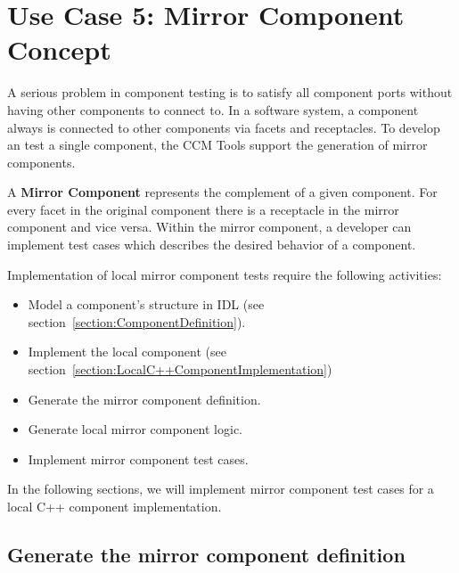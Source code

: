 \section{Use Case 5: Mirror Component Concept}
\label{section:MirrorComponentConcept}

A serious problem in component testing is to satisfy all component ports without
having other components to connect to.
In a software system, a component always is connected to other components via
facets and receptacles.
To develop an test a single component, the CCM Tools support the generation of 
mirror components. 

\vspace{3mm}
A {\bf Mirror Component} represents the complement of a given component. For every
facet in the original component there is a receptacle in the mirror component
and vice versa.
Within the mirror component, a developer can implement test cases which
describes the desired behavior of a component.

\vspace{3mm}
Implementation of local mirror component tests require the
following activities:
\begin{itemize}
	\item Model a component's structure in IDL 
			(see section~\ref{section:ComponentDefinition}). 
	\item Implement the local component (see section~\ref{section:LocalC++ComponentImplementation})

	\item Generate the mirror component definition.
	\item Generate local mirror component logic.
	\item Implement mirror component test cases.

\end{itemize}

In the following sections, we will implement mirror component test cases for a
local C++ component implementation.


\subsection{Generate the mirror component definition}
\label{subsection:GenerateMirrorComponentDefinition}


